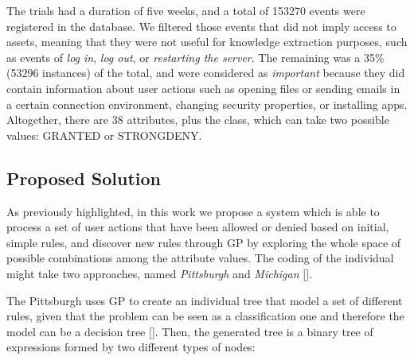 The trials had a duration of five weeks, and a total of 
153270 events were registered in the database. We filtered those events that did not imply access to assets, meaning that they were not useful for
knowledge extraction purposes, such as events of \textit{log in},
\textit{log out}, or \textit{restarting the server}.
The remaining was a 35\% (53296 instances) of the total, and were considered as \textit{important}
because they did contain information about user actions such as
opening files or sending emails in a certain connection environment,
changing security properties, or installing apps. Altogether, there
are 38 attributes, plus the class, which can take two possible values:
GRANTED or STRONGDENY. 


\subsection{Proposed Solution}
\label{subsec:solution}

As previously highlighted, in this work we propose a system which is
able to process a set of user actions that have been allowed or denied
based on initial, simple rules, and discover new rules through GP by exploring
the whole space of possible combinations among the attribute
values. The coding of the individual might take two approaches, named \textit{Pittsburgh} and \textit{Michigan}
[\cite{freitas2002data}].

The Pittsburgh uses GP to create an individual tree that
model a set of different rules, given that the problem can be seen as
a 
classification one and therefore the model can be a decision tree
[\cite{safavian1990survey}]. Then, the generated tree is a binary tree
of expressions formed by two different types of nodes:

